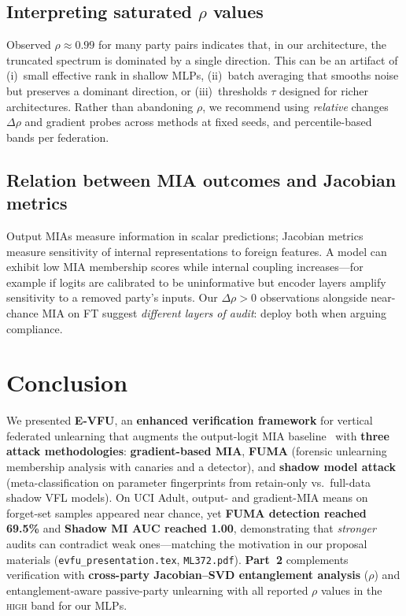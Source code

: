 \documentclass[sigconf,nonacm]{acmart}
\begin{document}
\subsection{Interpreting saturated $\rho$ values}
Observed $\rho\approx 0.99$ for many party pairs indicates that, in our architecture, the truncated spectrum is dominated by a single direction. This can be an artifact of (i)~small effective rank in shallow MLPs, (ii)~batch averaging that smooths noise but preserves a dominant direction, or (iii)~thresholds $\tau$ designed for richer architectures. Rather than abandoning $\rho$, we recommend using \emph{relative} changes $\Delta\rho$ and gradient probes across methods at fixed seeds, and percentile-based bands per federation.

\subsection{Relation between MIA outcomes and Jacobian metrics}
Output MIAs measure information in scalar predictions; Jacobian metrics measure sensitivity of internal representations to foreign features. A model can exhibit low MIA membership scores while internal coupling increases---for example if logits are calibrated to be uninformative but encoder layers amplify sensitivity to a removed party's inputs. Our $\Delta\rho > 0$ observations alongside near-chance MIA on FT suggest \emph{different layers of audit}: deploy both when arguing compliance.



\section{Conclusion}
\label{sec:conclusion}
We presented \textbf{E-VFU}, an \textbf{enhanced verification framework} for vertical federated unlearning that augments the output-logit MIA baseline~\cite{varshney2025vfu} with \textbf{three attack methodologies}: \textbf{gradient-based MIA}, \textbf{FUMA} (forensic unlearning membership analysis with canaries and a detector), and \textbf{shadow model attack} (meta-classification on parameter fingerprints from retain-only vs.\ full-data shadow VFL models). On UCI Adult, output- and gradient-MIA means on forget-set samples appeared near chance, yet \textbf{FUMA detection reached 69.5\%} and \textbf{Shadow MI AUC reached 1.00}, demonstrating that \emph{stronger} audits can contradict weak ones---matching the motivation in our proposal materials (\texttt{evfu\_presentation.tex}, \texttt{ML372.pdf}). \textbf{Part~2} complements verification with \textbf{cross-party Jacobian--SVD entanglement analysis} ($\rho$) and entanglement-aware passive-party unlearning  with all reported $\rho$ values in the \textsc{high} band for our MLPs.
\end{document}
